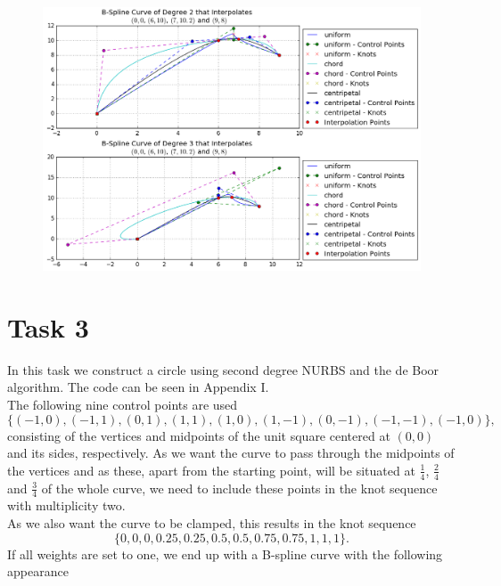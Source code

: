 \documentclass[]{article}
\begin{document}
\begin{figure}[h!]
	\includegraphics[scale=0.5]{task2}
\end{figure}

\section*{Task 3}
In this task we construct a circle using second degree NURBS and the de Boor algorithm. The code can be seen in Appendix I.\\
The following nine control points are used \begin{equation*}
\{(-1, 0), (-1, 1), (0, 1), (1, 1), (1, 0), (1, -1), (0, -1), (-1, -1), (-1, 0)\},
\end{equation*}
consisting of the vertices and midpoints of the unit square centered at $(0, 0)$ and its sides, respectively. As we want the curve to pass through the midpoints of the vertices and as these, apart from the starting point, will be situated at $\frac{1}{4}$, $\frac{2}{4}$ and $\frac{3}{4}$ of the whole curve, we need to include these points in the knot sequence with multiplicity two.\\
As we also want the curve to be clamped, this results in the knot sequence \begin{equation*}
\{0, 0, 0, 0.25, 0.25, 0.5, 0.5, 0.75, 0.75, 1, 1, 1\}.
\end{equation*}
If all weights are set to one, we end up with a B-spline curve with the following appearance
\end{document}
